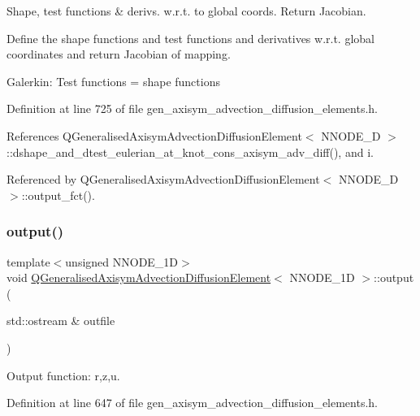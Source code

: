Shape, test functions \& derivs. w.\+r.\+t. to global coords. Return Jacobian. 

Define the shape functions and test functions and derivatives w.\+r.\+t. global coordinates and return Jacobian of mapping.

Galerkin\+: Test functions = shape functions 

Definition at line 725 of file gen\+\_\+axisym\+\_\+advection\+\_\+diffusion\+\_\+elements.\+h.



References Q\+Generalised\+Axisym\+Advection\+Diffusion\+Element$<$ N\+N\+O\+D\+E\+\_\+D $>$\+::dshape\+\_\+and\+\_\+dtest\+\_\+eulerian\+\_\+at\+\_\+knot\+\_\+cons\+\_\+axisym\+\_\+adv\+\_\+diff(), and i.



Referenced by Q\+Generalised\+Axisym\+Advection\+Diffusion\+Element$<$ N\+N\+O\+D\+E\+\_\+D $>$\+::output\+\_\+fct().

\mbox{\label{classQGeneralisedAxisymAdvectionDiffusionElement_a27d90ccfbecff454ee6d15ea44b1c956}} 
\subsubsection{\texorpdfstring{output()}{output()}\hspace{0.1cm}{\footnotesize\ttfamily [1/4]}}
{\footnotesize\ttfamily template$<$unsigned N\+N\+O\+D\+E\+\_\+1D$>$ \\
void \hyperlink{classQGeneralisedAxisymAdvectionDiffusionElement}{Q\+Generalised\+Axisym\+Advection\+Diffusion\+Element}$<$ N\+N\+O\+D\+E\+\_\+1D $>$\+::output (\begin{DoxyParamCaption}\item[{std\+::ostream \&}]{outfile }\end{DoxyParamCaption})\hspace{0.3cm}{\ttfamily [inline]}}



Output function\+: r,z,u. 



Definition at line 647 of file gen\+\_\+axisym\+\_\+advection\+\_\+diffusion\+\_\+elements.\+h.



